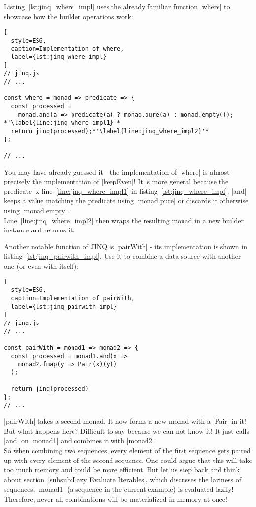 Listing~\ref{lst:jinq_where_impl} uses the already familiar function |where| to
showcase how the builder operations work:

\begin{lstlisting}[
  style=ES6,
  caption=Implementation of where,
  label={lst:jinq_where_impl}
]
// jinq.js
// ...

const where = monad => predicate => {
  const processed = 
    monad.and(a => predicate(a) ? monad.pure(a) : monad.empty()); *'\label{line:jinq_where_impl1}'*
  return jinq(processed);*'\label{line:jinq_where_impl2}'*
};

// ...
\end{lstlisting}

You may have already guessed it - the implementation of |where| is almost
precisely the implementation of |keepEven|! It is more general because the
predicate |x %
line~\ref{line:jinq_where_impl1} in listing~\ref{lst:jinq_where_impl}: |and|
keeps a value matching the predicate using |monad.pure| or discards it
otherwise using |monad.empty|.\\
Line~\ref{line:jinq_where_impl2} then wraps the resulting monad in a new
builder instance and returns it.

Another notable function of JINQ is |pairWith| - its implementation is shown in
listing~\ref{lst:jinq_pairwith_impl}. Use it to combine a data source with
another one (or even with itself):

\begin{lstlisting}[
  style=ES6,
  caption=Implementation of pairWith,
  label={lst:jinq_pairwith_impl}
]
// jinq.js
// ...

const pairWith = monad1 => monad2 => {
  const processed = monad1.and(x =>
    monad2.fmap(y => Pair(x)(y))
  );

  return jinq(processed)
};
// ...
\end{lstlisting}

|pairWith| takes a second monad. It now forms a new monad with a |Pair| in it!
But what happens here? Difficult to say because we can not know it! It just
calls |and| on |monad1| and combines it with |monad2|. \\
So when combining two sequences, every element of the first sequence gets
paired up with every element of the second sequence. One could argue that this
will take too much memory and could be more efficient. But let us step back and
think about section~\ref{subsub:Lazy Evaluate Iterables}, which discusses the laziness of sequences. |monad1|
(a sequence in the current example) is evaluated lazily! Therefore, never all
combinations will be materialized in memory at once!


